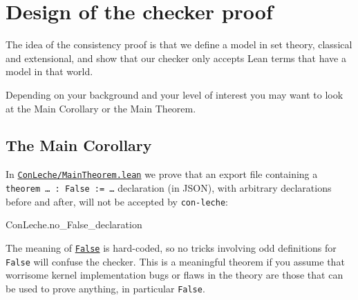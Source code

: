 \documentclass{article}
\newcommand\code[1]{\texttt{#1}}
\begin{document}
\section*{Design of the checker proof}

The idea of the consistency proof is that we define a model in set theory, classical and extensional, and show that our checker only accepts Lean terms that have a model in that world.

Depending on your background and your level of interest you may want to look at the Main Corollary or the Main Theorem.

\subsection*{The Main Corollary}

In \href{https://github.com/leanprover/con-leche/blob/master/ConLeche/MainTheorem.lean}{\code{ConLeche/MainTheorem.lean}} we prove that an export file containing a \code{theorem … : False := …} declaration (in JSON), with arbitrary declarations before and after, will not be accepted by \code{con-leche}:

\begin{leanblock}[view=lean, sum=gBGlbkLscY]{ConLeche.no_False_declaration}{}
\end{leanblock}

The meaning of \href{https://github.com/leanprover/con-leche/blob/master/ConLeche/Kernel/Basis/False.lean#L50-L51}{\code{False}} is hard-coded, so no tricks involving odd definitions for \code{False} will confuse the checker. This is a meaningful theorem if you assume that worrisome kernel implementation bugs or flaws in the theory are those that can be used to prove anything, in particular \code{False}.
\end{document}
